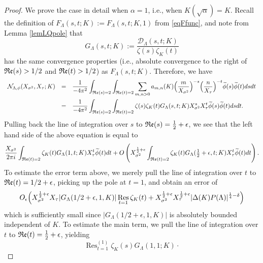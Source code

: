 \documentclass[10pt]{article}
\theoremstyle{plain}
\theoremstyle{definition}
\theoremstyle{remark}
\DeclareMathOperator{\Res}{Res}
\renewcommand{\Re}{\frak{Re}}
\def\cD{{\mathcal D}}
\def\cN{{\mathcal N}}
\begin{document}
\begin{proof}
  
We prove the case in detail when $\alpha=1$, i.e., when $K(\sqrt{\alpha}) =
K$. Recall the definition of $F_\Lambda(s,t;K):=F_\Lambda(s,t;K,1)$
from \eqref{eqFfunc}, and note from Lemma \ref{lemLQpole} that
\begin{equation*} G_\Lambda(s,t;K) :=
  \frac{\cD_\Lambda(s,t;K)}{\zeta(s)\zeta_K(t)} \end{equation*} has
the same convergence properties (i.e., absolute convergence to the
right of $\Re(s)>1/2$ and $\Re(t)>1/2$) as $F_\Lambda(s,t;K)$. Therefore, we
have
\begin{equation}
\begin{array}{rcl}
\displaystyle\cN_{\Lambda,\phi}(X_{\sigma^2},X_\tau;K)
&=&
\displaystyle\frac{1}{-4\pi^2}\int_{\Re(s)=2}\int_{\Re(t)=2}
\sum_{m,n>0}a_{m,n}(K)\Bigl(\frac{m}{X_{\sigma^2}}\Bigr)^{-s}
\Bigl(\frac{n}{X_\tau}\Bigr)^{-t}
\widetilde{\phi}(s)\widetilde{\phi}(t)dsdt
\\[.2in]&=&
\displaystyle\frac{1}{-4\pi^2}\int_{\Re(s)=2}\int_{\Re(t)=2}
\zeta(s)\zeta_K(t)G_\Lambda(s,t;K)
X_{\sigma^2}^s X_\tau^t\widetilde{\phi}(s)\widetilde{\phi}(t)dsdt.
\end{array}
\end{equation}
Pulling back the line of integration over $s$ to
$\Re(s)=\frac12+\epsilon$, we see that the left hand side of the above
equation is equal to
\begin{equation*}
\frac{X_{\sigma^2}}{2\pi i}
\int_{\Re(t)=2}\zeta_K(t)G_\Lambda(1,t; K)X_\tau^t\widetilde{\phi}(t)dt
+O\left(X_{\sigma^2}^{\frac12+\epsilon}\int_{\Re(t)=2}\zeta_K(t)
G_\Lambda({\textstyle\frac12}+\epsilon,t;K)
X_\tau^t\widetilde{\phi}(t)dt\right).
\end{equation*}
To estimate the error term above, we merely pull the line of
integration over $t$ to $\Re(t)=1/2+\epsilon$, picking up the pole at
$t=1$, and obtain an error of
\begin{equation*}
O_\epsilon\Bigl(
X_{\sigma^2}^{\frac12+\epsilon}X_\tau |G_\Lambda(1/2+\epsilon,1,K)|
\Res_{t=1}\zeta_K(t)+
X_{\sigma^2}^{\frac12+\epsilon}X_\tau^{\frac12+\epsilon}
|\Delta(K)P(\Lambda)|^{\frac14-\delta}
\Bigr)  
\end{equation*}
which is sufficiently small since $|G_\Lambda(1/2+\epsilon,1,K)|$ is
absolutely bounded independent of $K$. To estimate the main term, we
pull the line of integration over $t$ to $\Re(t)=\frac12+\epsilon$,
yielding
\begin{equation*} 
\Res^{(1)}_{t=1}\zeta_K(s)G_\Lambda(1,1;K)\cdot

\end{equation*}
\end{proof}
\end{document}
